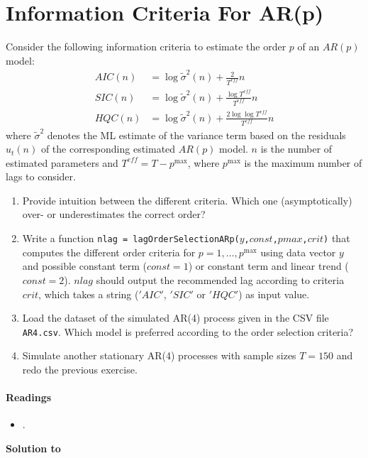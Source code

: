 \section[Information Criteria For AR(p)]{Information Criteria For AR(p)\label{ex:InformationCriteriaARp}}
Consider the following information criteria to estimate the order \(p\) of an \(AR(p)\) model: 
\begin{align*}
AIC(n)  &= \log\tilde{\sigma}^2(n) + \frac{2}{T^{eff}}n\\
SIC(n)  &= \log\tilde{\sigma}^2(n) + \frac{\log T^{eff}}{T^{eff}}n\\
HQC(n)  &= \log\tilde{\sigma}^2(n) + \frac{2\log \log T^{eff}}{T^{eff}}n
\end{align*}
where \(\tilde{\sigma}^2\) denotes the ML estimate of the variance term
based on the residuals \(\hat{u}_t(n)\) of the corresponding estimated \(AR(p)\) model.
\(n\) is the number of estimated parameters and \(T^{eff}=T-p^{\text{max}}\),
  where \(p^{\text{max}}\) is the maximum number of lags to consider.
\begin{enumerate}
\item Provide intuition between the different criteria.
Which one (asymptotically) over- or underestimates the correct order?
\item Write a function \texttt{nlag = lagOrderSelectionARp(\(y\),\(const\),\(pmax\),\(crit\))}
  that computes the different order criteria for \(p = 1,\ldots ,p^{\text{max}}\)
  using data vector \(y\) and possible constant term (\(const=1\))
  or constant term and linear trend (\(const=2\)).
  \(nlag\) should output the recommended lag according to criteria \(crit\),
  which takes a string (\('AIC'\), \('SIC'\) or \('HQC'\)) as input value.
\item Load the dataset of the simulated AR(4) process given in the CSV file \texttt{AR4.csv}.
Which model is preferred according to the order selection criteria?
\item Simulate another stationary AR(4) processes with sample sizes \(T = 150\)
  and redo the previous exercise.
\end{enumerate}

\paragraph{Readings}
\begin{itemize}
	\item \textcite{Lutkepohl_2004_UnivariateTimeSeries}.
\end{itemize}

\begin{solution}\textbf{Solution to }
\ifDisplaySolutions

\fi
\newpage
\end{solution}